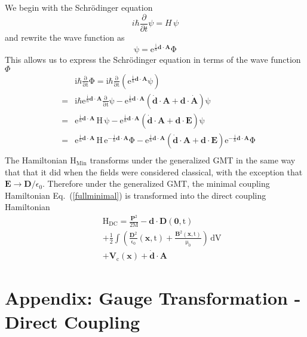 We begin with the Schr\"{o}dinger equation
\begin{equation}
i\hbar\frac{\partial}{\partial t}\psi=H\,\psi
\end{equation}
and rewrite the wave function as
\begin{equation}
\mathrm{\psi=e^{\frac{i}{\hbar}\mathbf{d}\cdot\mathbf{A}}\Phi}
\end{equation}
This allows us to express the Schr\"{o}dinger equation in terms of the wave function $\Phi$ 
\begin{eqnarray}
&&\mathrm{i\hbar\frac{\partial}{\partial t}\Phi=i\hbar\frac{\partial}{\partial t}\left(e^{\frac{i}{\hbar}\mathbf{d}\cdot\mathbf{A}}\psi\right)}\nonumber \\
&=&\mathrm{i\hbar e^{\frac{i}{\hbar}\mathbf{d}\cdot\mathbf{A}}\frac{\partial}{\partial t}\psi-e^{\frac{i}{\hbar}\mathbf{d}\cdot\mathbf{A}}\left(\dot{\mathbf{d}}\cdot\mathbf{A}+\mathbf{d}\cdot\dot{\mathbf{A}}\right)\psi} \nonumber \\
&=&\mathrm{e^{\frac{i}{\hbar}\mathbf{d}\cdot\mathbf{A}}\,H\,\psi-e^{\frac{i}{\hbar}\mathbf{d}\cdot\mathbf{A}}\left(\dot{\mathbf{d}}\cdot\mathbf{A}+\mathbf{d}\cdot\mathbf{E}\right)\psi} \nonumber \\
&=&\mathrm{e^{\frac{i}{\hbar}\mathbf{d}\cdot\mathbf{A}}\,H\,e^{-\frac{i}{\hbar}\mathbf{d}\cdot\mathbf{A}}\Phi-e^{\frac{i}{\hbar}\mathbf{d}\cdot\mathbf{A}}\left(\dot{\mathbf{d}}\cdot\mathbf{A}+\mathbf{d}\cdot\mathbf{E}\right)e^{-\frac{i}{\hbar}\mathbf{d}\cdot\mathbf{A}}\Phi} \nonumber \\
\end{eqnarray}
The Hamiltonian $\mathrm{H_{Min}}$ transforms under the generalized GMT in the same way that that it did when the fields were considered classical, with the exception that $\mathbf{E}\rightarrow\mathbf{D}/\epsilon_0$.  Therefore under the generalized GMT, the minimal coupling Hamiltonian Eq.\ (\ref{fullminimal}) is transformed into the direct coupling Hamiltonian
\begin{eqnarray}
&&\mathrm{H_{DC}=\frac{\mathbf{P}^2}{2M}-\mathbf{d}\cdot\mathbf{D}(\mathbf{0},t)}\nonumber \\
&&\mathrm{+\frac{1}{2}\int\left( \frac{\mathbf{D}^2}{\epsilon_0}(\mathbf{x},t)+\frac{\mathbf{B}^2(\mathbf{x},t)}{\mu_0}\right)\,dV} \nonumber \\
&&\mathrm{+\mathbf{V}_c(\mathbf{x})+\dot{\mathbf{d}}\cdot\mathbf{A}}
\end{eqnarray}

\newpage
\section{Appendix: Gauge Transformation - Direct Coupling}
\label{App_1-3} 


